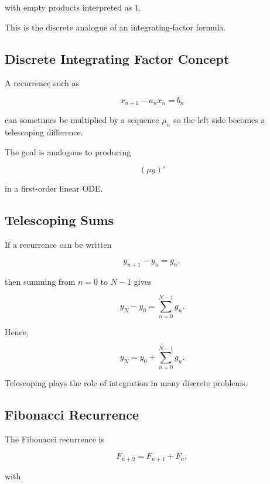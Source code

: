 with empty products interpreted as \(1\).

This is the discrete analogue of an integrating-factor formula.

\subsection{Discrete Integrating Factor Concept}
\label{subsec:discrete-integrating-factor}

A recurrence such as

\[
x_{n+1}-a_nx_n=b_n
\]

can sometimes be multiplied by a sequence \(\mu_n\) so the left side
becomes a telescoping difference.

The goal is analogous to producing

\[
(\mu y)'
\]

in a first-order linear ODE.

\subsection{Telescoping Sums}
\label{subsec:difference-telescoping}

If a recurrence can be written

\[
\boxed{
y_{n+1}-y_n=g_n,
}
\]

then summing from \(n=0\) to \(N-1\) gives

\[
y_N-y_0
=
\sum_{n=0}^{N-1}g_n.
\]

Hence,

\[
\boxed{
y_N
=
y_0
+
\sum_{n=0}^{N-1}g_n.
}
\]

Telescoping plays the role of integration in many discrete problems.

\subsection{Fibonacci Recurrence}
\label{subsec:fibonacci-difference-equation}

The Fibonacci recurrence is

\[
\boxed{
F_{n+2}
=
F_{n+1}
+
F_n,
}
\]

with

